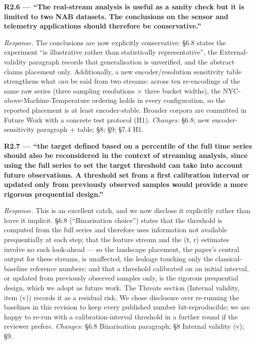 \documentclass[
  11pt,
]{article}
\begin{document}
\textbf{R2.6 --- ``The real-stream analysis is useful as a sanity check
but it is limited to two NAB datasets. The conclusions on the sensor and
telemetry applications should therefore be conservative.''}

\emph{Response.} The conclusions are now explicitly conservative: §6.8
states the experiment ``is illustrative rather than statistically
representative'', the External-validity paragraph records that
generalisation is unverified, and the abstract claims placement only.
Additionally, a new encoder/resolution sensitivity table strengthens
what \emph{can} be said from two streams: across ten re-encodings of the
same raw series (three sampling resolutions × three bucket widths), the
NYC-above-Machine-Temperature ordering holds in every configuration, so
the reported placement is at least encoder-stable. Broader corpora are
committed in Future Work with a concrete test protocol (H1).
\emph{Changes:} §6.8; new encoder-sensitivity paragraph + table; §8; §9;
§7.4 H1.

\textbf{R2.7 --- ``the target defined based on a percentile of the full
time series should also be reconsidered in the context of streaming
analysis, since using the full series to set the target threshold can
take into account future observations. A threshold set from a first
calibration interval or updated only from previously observed samples
would provide a more rigorous prequential design.''}

\emph{Response.} This is an excellent catch, and we now disclose it
explicitly rather than leave it implicit. §6.8 (``Binarisation choice'')
states that the threshold is computed from the full series and therefore
uses information not available prequentially at each step; that the
feature stream and the (τ, r) estimates involve no such look-ahead ---
so the landscape placement, the paper's central output for these
streams, is unaffected, the leakage touching only the classical-baseline
reference numbers; and that a threshold calibrated on an initial
interval, or updated from previously observed samples only, is the
rigorous prequential design, which we adopt as future work. The Threats
section (Internal validity, item (v)) records it as a residual risk. We
chose disclosure over re-running the baselines in this revision to keep
every published number bit-reproducible; we are happy to re-run with a
calibration-interval threshold in a further round if the reviewer
prefers. \emph{Changes:} §6.8 Binarisation paragraph; §8 Internal
validity (v); §9.
\end{document}
